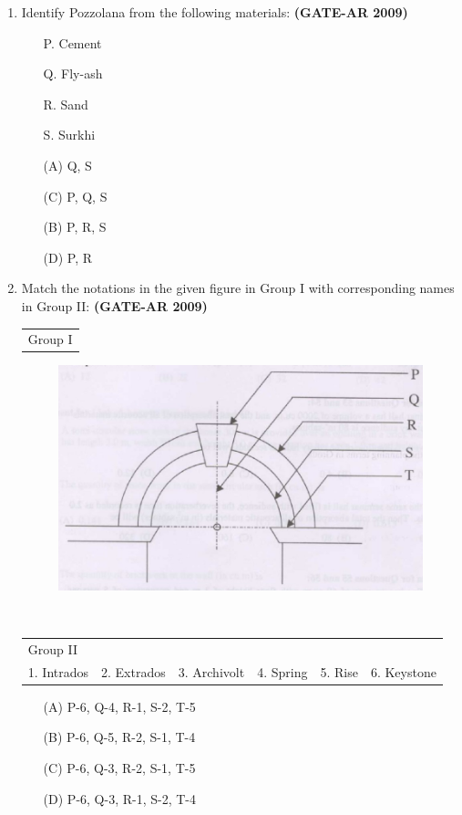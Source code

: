 \documentclass[a4paper,10pt]{article}
\begin{document}
\begin{enumerate}
    \item Identify Pozzolana from the following materials: \hfill \textbf{(GATE-AR 2009)}
    \begin{itemize}
        \item[P.] Cement
        \item[Q.] Fly-ash
        \item[R.] Sand
        \item[S.] Surkhi
    \end{itemize}
    \begin{multicols}{2}
	\begin{itemize}
        \item[(A)] Q, S
        \item[(C)] P, Q, S
        \item[(B)] P, R, S
        \item[(D)] P, R
    \end{itemize}
	\end{multicols}

	\item Match the notations in the given figure in Group I with corresponding names in Group II: \hfill \textbf{(GATE-AR 2009)} \\
    \begin{tabular}{ p }
	Group I \\
	\end{tabular}
	\begin{figure}[h!]
        \centering
        \includegraphics[width=0.5\linewidth]{figs/img_04.jpg}
        \label{fig:Img04}
	\end{figure} \\
	\begin{tabular}{ p p p p p p }
	Group II & & & & & \\
	1. Intrados & 2. Extrados & 3. Archivolt & 4. Spring & 5. Rise & 6. Keystone \\
	\end{tabular}	
	\begin{itemize}
        \item[(A)] P-6, Q-4, R-1, S-2, T-5
        \item[(B)] P-6, Q-5, R-2, S-1, T-4
        \item[(C)] P-6, Q-3, R-2, S-1, T-5
        \item[(D)] P-6, Q-3, R-1, S-2, T-4
    \end{itemize}


\end{enumerate}
\end{document}
